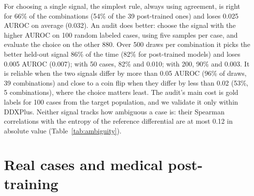 \documentclass[wcp]{jmlr}
\begin{document}
For choosing a single signal, the simplest rule, always using agreement, is right for 66\% of the combinations (54\% of the 39 post-trained ones) and loses 0.025 AUROC on average (0.032). An audit does better: choose the signal with the higher AUROC on 100 random labeled cases, using five samples per case, and evaluate the choice on the other 880. Over 500 draws per combination it picks the better held-out signal 86\% of the time (82\% for post-trained models) and loses 0.005 AUROC (0.007); with 50 cases, 82\% and 0.010; with 200, 90\% and 0.003. It is reliable when the two signals differ by more than 0.05 AUROC (96\% of draws, 39 combinations) and close to a coin flip when they differ by less than 0.02 (53\%, 5 combinations), where the choice matters least. The audit's main cost is gold labels for 100 cases from the target population, and we validate it only within DDXPlus. Neither signal tracks how ambiguous a case is: their Spearman correlations with the entropy of the reference differential are at most 0.12 in absolute value (Table~\ref{tab:ambiguity}).


\section{Real cases and medical post-training}\label{app:medrare}
\end{document}
